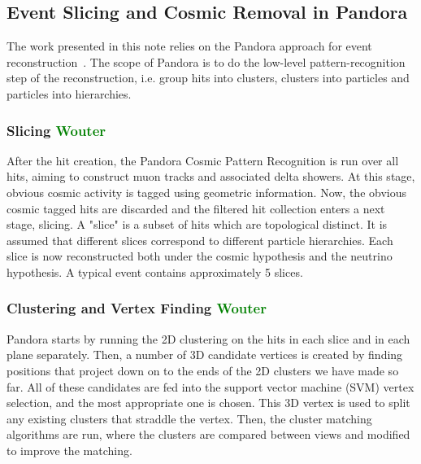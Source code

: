\label{sec:sliceID}
\subsection{Event Slicing and Cosmic Removal in Pandora}

The work presented in this note relies on the Pandora approach for event reconstruction~\cite{bib:pandoraub}. The scope of Pandora is to do the low-level pattern-recognition step of the reconstruction, i.e. group hits into clusters, clusters into particles and particles into hierarchies. 

\subsubsection{Slicing \textcolor{green}{Wouter}}
After the hit creation, the Pandora Cosmic Pattern Recognition is run over all hits, aiming to construct muon tracks and associated delta showers. At this stage, obvious cosmic activity is tagged using geometric information. Now, the obvious cosmic tagged hits are discarded and the filtered hit collection enters a next stage, slicing. A "slice" is a subset of hits which are topological distinct. It is assumed that different slices correspond to different particle hierarchies. Each slice is now reconstructed both under the cosmic hypothesis and the neutrino hypothesis. A typical event contains approximately 5 slices.

\subsubsection{Clustering and Vertex Finding \textcolor{green}{Wouter}} 
Pandora starts by running the 2D clustering on the hits in each slice and in each plane separately. Then, a number of 3D candidate vertices is created by finding positions that project down on to the ends of the 2D clusters we have made so far. All of these candidates are fed into the support vector machine (SVM) vertex selection, and the most appropriate one is chosen. This 3D vertex is used to split any existing clusters that straddle the vertex. Then, the cluster matching algorithms are run, where the clusters are compared between views and modified to improve the matching.

